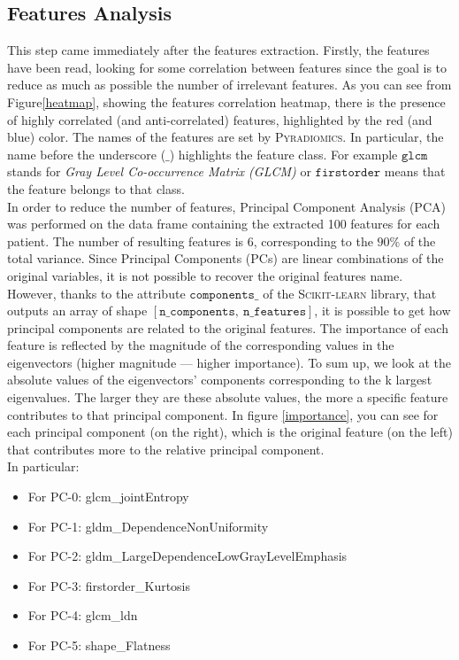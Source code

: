 \documentclass{standalone}
\begin{document}
\subsection{Features Analysis}

This step came immediately after the features extraction.
Firstly, the features have been read, looking for some correlation between features since the goal is to reduce as much as possible the number of irrelevant features.
As you can see from Figure\ref{heatmap}, showing the features correlation heatmap, there is the presence of highly correlated (and anti-correlated) features, highlighted by the red (and blue) color.
The names of the features are set by \textsc{Pyradiomics}. In particular, the name before the underscore ($\_$) highlights the feature class. For example $\mathtt{glcm}$ stands for \textit{Gray Level Co-occurrence Matrix (GLCM)} or $\mathtt{firstorder}$ means that the feature belongs to that class.
\\
In order to reduce the number of features, Principal Component Analysis (PCA) was performed on the data frame containing the extracted 100 features for each patient.
The number of resulting features is 6, corresponding to the $90 \% $ of the total variance.
Since Principal Components (PCs) are linear combinations of the original variables, it is not possible to recover the original features name. 
However, thanks to the attribute $\mathtt{components\_}$ of the \textsc{Scikit-learn} library\cite{scikit}, that outputs an array of shape $[ \mathtt{n \_ components} , \:  \mathtt{n \_ features} ]$, it is possible to get how principal components are related to the original features.
The importance of each feature is reflected by the magnitude of the corresponding values in the eigenvectors (higher magnitude — higher importance).
To sum up, we look at the absolute values of the eigenvectors’ components corresponding to the k largest eigenvalues. The larger they are these absolute values, the more a specific feature contributes to that principal component.
In figure \ref{importance}, you can see for each principal component (on the right), which is the original feature (on the left) that contributes more to the relative principal component.
\\
In particular: 
\begin{itemize}
    \item For PC-0: glcm\_jointEntropy
    \item For PC-1: gldm\_DependenceNonUniformity
    \item For PC-2: gldm\_LargeDependenceLowGrayLevelEmphasis
    \item For PC-3: firstorder\_Kurtosis
    \item For PC-4: glcm\_ldn
    \item For PC-5: shape\_Flatness
\end{itemize}
\end{document}
